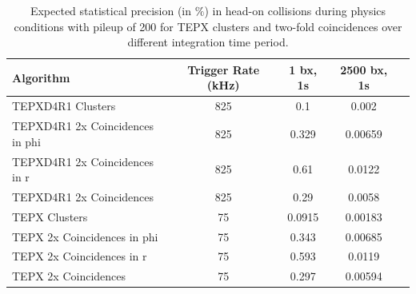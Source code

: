 \begin{table}[htbp]
\centering
\caption[Expected stat. precision of TEPX under high pileup]{Expected statistical precision (in $\%$) in head-on collisions during physics conditions with pileup of 200 for TEPX clusters and two-fold coincidences over different integration time period.}
\begin{small} %
\begin{tabular}{lcccc}
Algorithm & Trigger Rate (kHz) & 1 bx, 1s & 2500 bx, 1s\\
\hline
TEPXD4R1 Clusters & 825 & 0.1 & 0.002  \\
TEPXD4R1 2x Coincidences in phi & 825 & 0.329 & 0.00659 \\
TEPXD4R1 2x Coincidences in r & 825 & 0.61 & 0.0122  \\
TEPXD4R1 2x Coincidences & 825 & 0.29 & 0.0058  \\
TEPX Clusters & 75 & 0.0915 & 0.00183  \\
TEPX 2x Coincidences in phi & 75 & 0.343 & 0.00685 \\
TEPX 2x Coincidences in r & 75 & 0.593 & 0.0119  \\
TEPX 2x Coincidences & 75 & 0.297 & 0.00594  \\
\end{tabular}
\end{small}
\end{table}


